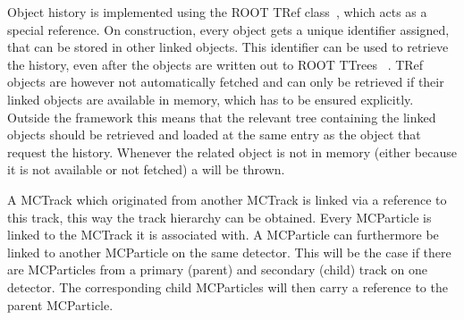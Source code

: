 Object history is implemented using the ROOT TRef class~\cite{roottref}, which acts as a special reference.
On construction, every object gets a unique identifier assigned, that can be stored in other linked objects.
This identifier can be used to retrieve the history, even after the objects are written out to ROOT TTrees ~\cite{roottree}.
TRef objects are however not automatically fetched and can only be retrieved if their linked objects are available in memory, which has to be ensured explicitly.
Outside the framework this means that the relevant tree containing the linked objects should be retrieved and loaded at the same entry as the object that request the history.
Whenever the related object is not in memory (either because it is not available or not fetched) a  will be thrown.

A MCTrack which originated from another MCTrack is linked via a reference to this track, this way the track hierarchy can be obtained.
Every MCParticle is linked to the MCTrack it is associated with.
A MCParticle can furthermore be linked to another MCParticle on the same detector.
This will be the case if there are MCParticles from a primary (parent) and secondary (child) track on one detector.
The corresponding child MCParticles will then carry a reference to the parent MCParticle.
